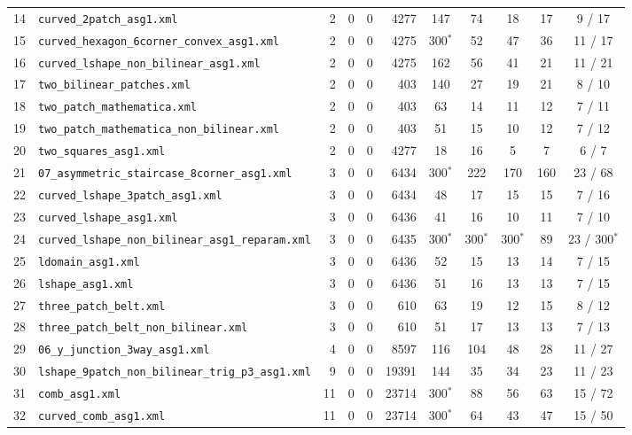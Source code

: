 \documentclass[10pt,a4paper]{article}
\begin{document}
{\begin{longtable}{@{}rlrrrrccccc@{}}
14 & \texttt{curved\_2patch\_asg1.xml} & 2 & 0 & 0 & 4277 & 147 & 74 & 18 & 17 & 9 / 17 \\
15 & \texttt{curved\_hexagon\_6corner\_convex\_asg1.xml} & 2 & 0 & 0 & 4275 & 300$^*$ & 52 & 47 & 36 & 11 / 17 \\
16 & \texttt{curved\_lshape\_non\_bilinear\_asg1.xml} & 2 & 0 & 0 & 4275 & 162 & 56 & 41 & 21 & 11 / 21 \\
17 & \texttt{two\_bilinear\_patches.xml} & 2 & 0 & 0 & 403 & 140 & 27 & 19 & 21 & 8 / 10 \\
18 & \texttt{two\_patch\_mathematica.xml} & 2 & 0 & 0 & 403 & 63 & 14 & 11 & 12 & 7 / 11 \\
19 & \texttt{two\_patch\_mathematica\_non\_bilinear.xml} & 2 & 0 & 0 & 403 & 51 & 15 & 10 & 12 & 7 / 12 \\
20 & \texttt{two\_squares\_asg1.xml} & 2 & 0 & 0 & 4277 & 18 & 16 & 5 & 7 & 6 / 7 \\
21 & \texttt{07\_asymmetric\_staircase\_8corner\_asg1.xml} & 3 & 0 & 0 & 6434 & 300$^*$ & 222 & 170 & 160 & 23 / 68 \\
22 & \texttt{curved\_lshape\_3patch\_asg1.xml} & 3 & 0 & 0 & 6434 & 48 & 17 & 15 & 15 & 7 / 16 \\
23 & \texttt{curved\_lshape\_asg1.xml} & 3 & 0 & 0 & 6436 & 41 & 16 & 10 & 11 & 7 / 10 \\
24 & \texttt{curved\_lshape\_non\_bilinear\_asg1\_reparam.xml} & 3 & 0 & 0 & 6435 & 300$^*$ & 300$^*$ & 300$^*$ & 89 & 23 / 300$^*$ \\
25 & \texttt{ldomain\_asg1.xml} & 3 & 0 & 0 & 6436 & 52 & 15 & 13 & 14 & 7 / 15 \\
26 & \texttt{lshape\_asg1.xml} & 3 & 0 & 0 & 6436 & 51 & 16 & 13 & 13 & 7 / 15 \\
27 & \texttt{three\_patch\_belt.xml} & 3 & 0 & 0 & 610 & 63 & 19 & 12 & 15 & 8 / 12 \\
28 & \texttt{three\_patch\_belt\_non\_bilinear.xml} & 3 & 0 & 0 & 610 & 51 & 17 & 13 & 13 & 7 / 13 \\
29 & \texttt{06\_y\_junction\_3way\_asg1.xml} & 4 & 0 & 0 & 8597 & 116 & 104 & 48 & 28 & 11 / 27 \\
30 & \texttt{lshape\_9patch\_non\_bilinear\_trig\_p3\_asg1.xml} & 9 & 0 & 0 & 19391 & 144 & 35 & 34 & 23 & 11 / 23 \\
31 & \texttt{comb\_asg1.xml} & 11 & 0 & 0 & 23714 & 300$^*$ & 88 & 56 & 63 & 15 / 72 \\
32 & \texttt{curved\_comb\_asg1.xml} & 11 & 0 & 0 & 23714 & 300$^*$ & 64 & 43 & 47 & 15 / 50 \\

\end{longtable}}
\end{document}
